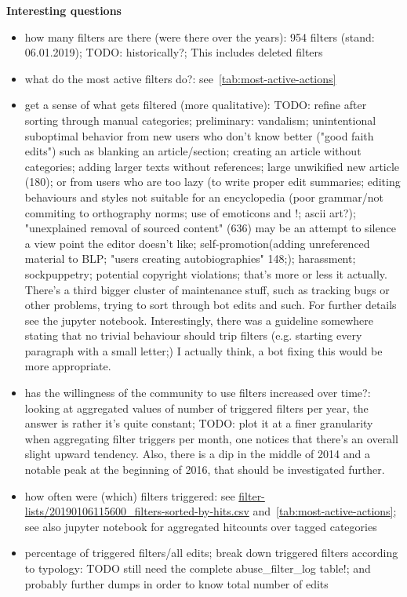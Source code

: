 \documentclass{sigchi}
\begin{document}
\textbf{Interesting questions}
\begin{itemize}
    \item how many filters are there (were there over the years): 954 filters (stand: 06.01.2019); TODO: historically?; This includes deleted filters
    \item what do the most active filters do?: see~\ref{tab:most-active-actions}
    \item get a sense of what gets filtered (more qualitative): TODO: refine after sorting through manual categories; preliminary: vandalism; unintentional suboptimal behavior from new users who don't know better ("good faith edits") such as blanking an article/section; creating an article without categories; adding larger texts without references; large unwikified new article (180); or from users who are too lazy (to write proper edit summaries; editing behaviours and styles not suitable for an encyclopedia (poor grammar/not commiting to orthography norms; use of emoticons and !; ascii art?); "unexplained removal of sourced content" (636) may be an attempt to silence a view point the editor doesn't like; self-promotion(adding unreferenced material to BLP; "users creating autobiographies" 148;); harassment; sockpuppetry; potential copyright violations; that's more or less it actually. There's a third bigger cluster of maintenance stuff, such as tracking bugs or other problems, trying to sort through bot edits and such. For further details see the jupyter notebook.
        Interestingly, there was a guideline somewhere stating that no trivial behaviour should trip filters (e.g. starting every paragraph with a small letter;) I actually think, a bot fixing this would be more appropriate.
    \item has the willingness of the community to use filters increased over time?: looking at aggregated values of number of triggered filters per year, the answer is rather it's quite constant; TODO: plot it at a finer granularity
        when aggregating filter triggers per month, one notices that there's an overall slight upward tendency.
        Also, there is a dip in the middle of 2014 and a notable peak at the beginning of 2016, that should be investigated further.
    \item how often were (which) filters triggered: see \url{filter-lists/20190106115600_filters-sorted-by-hits.csv} and~\ref{tab:most-active-actions}; see also jupyter notebook for aggregated hitcounts over tagged categories
    \item percentage of triggered filters/all edits; break down triggered filters according to typology: TODO still need the complete abuse\_filter\_log table!; and probably further dumps in order to know total number of edits

\end{itemize}
\end{document}
